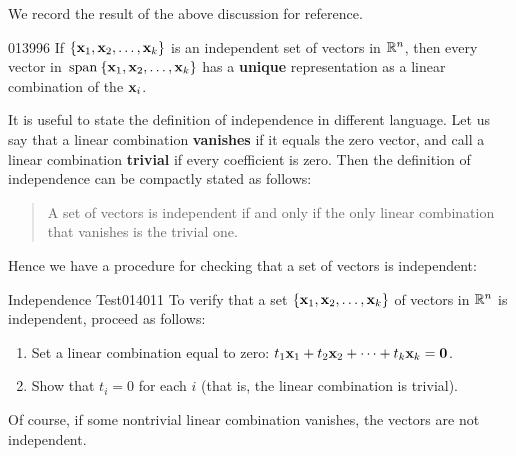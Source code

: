 \noindent We record the result of the above discussion for reference.

\begin{theorem}{}{013996} %
If $\{\textbf{x}_{1}, \textbf{x}_{2}, \dots, \textbf{x}_{k}\}$ is an independent set of vectors in $\mathbb{R}^n$, then every vector in $\thinspace\operatorname{span\medspace}\{\textbf{x}_{1}, \textbf{x}_{2}, \dots, \textbf{x}_{k}\}$ has a \textbf{unique} representation as a linear combination of the $\textbf{x}_{i}$.
\end{theorem}

It is useful to state the definition of independence in different
language. Let us say that a linear combination \textbf{vanishes}  if it equals the zero vector, and
call a linear combination \textbf{trivial}   if every coefficient is zero. Then the definition of independence can be compactly stated as follows:

\begin{quotation}
\noindent A set of vectors is independent if and only if the only linear combination that vanishes is the trivial one. 

\end{quotation}
Hence we have a procedure for checking that a set of vectors is independent:

\begin{theorem*}{Independence Test}{014011}
To verify that a set $\{\textbf{x}_{1}, \textbf{x}_{2}, \dots, \textbf{x}_{k}\}$ of vectors in $\mathbb{R}^n$ is independent, proceed as follows:

\begin{enumerate}
\item Set a linear combination equal to zero: $t_{1}\textbf{x}_{1} + t_{2}\textbf{x}_{2} + \dots + t_{k}\textbf{x}_{k} = \textbf{0}$.

\item Show that $t_i = 0$ for each $i$ (that is, the linear combination is trivial).

\end{enumerate}

Of course, if some nontrivial linear combination vanishes, the vectors are not independent.
\end{theorem*}

